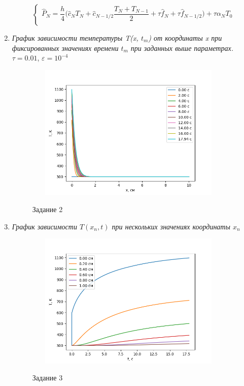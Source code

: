\begin{enumerate}
\begin{equation*}
\begin{cases}
			\hat{P}_N = \dfrac{h}{4}\big(\hat{c}_N T_N + \hat{c}_{N-1/2} \dfrac{T_N + T_{N-1}}{2} + \tau \hat{f}_{N} + \tau \hat{f}_{N-1/2}\big) + \tau \alpha_N T_0\\
		\end{cases}
	\end{equation*}
	

	
	\newpage
	\item \textit{График зависимости температуры T(x, $t_m$) от координаты x при фиксированных значениях времени $t_m$ при заданных выше параметрах.}\\
	
	$\tau = 0.01$, $\varepsilon = 10^{-4}$
	
	\begin{figure}[h]
		\begin{center}
			{\includegraphics[height=6.5cm, width = 10cm]{../pictures/Figure_1}}
			\caption{Задание 2}
		\end{center}
	\end{figure}

	\item\textit{График зависимости $T(x_n, t)$ при нескольких значениях координаты $x_n$}
	\begin{figure}[h]
		\begin{center}
			{\includegraphics[height=6.5cm, width = 10cm]{../pictures/Figure_2}}
			\caption{Задание 3}
		\end{center}
	\end{figure}
	
\end{enumerate}